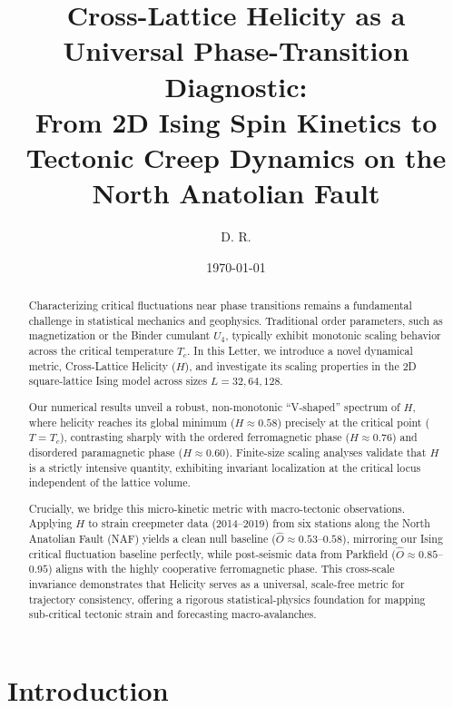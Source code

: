 \documentclass[aps,prl,twocolumn,superscriptaddress,byrevtex]{article}
\title{Cross-Lattice Helicity as a Universal Phase-Transition Diagnostic: \\
From 2D Ising Spin Kinetics to Tectonic Creep Dynamics on the North Anatolian Fault}
\author{D. R.}
\date{\today}
\begin{document}
\maketitle

\begin{abstract}
Characterizing critical fluctuations near phase transitions remains a fundamental challenge
in statistical mechanics and geophysics. Traditional order parameters, such as magnetization
or the Binder cumulant $U_4$, typically exhibit monotonic scaling behavior across the critical
temperature $T_c$. In this Letter, we introduce a novel dynamical metric, Cross-Lattice
Helicity ($H$), and investigate its scaling properties in the 2D square-lattice Ising model
across sizes $L = 32, 64, 128$.

Our numerical results unveil a robust, non-monotonic ``V-shaped'' spectrum of $H$, where
helicity reaches its global minimum ($H \approx 0.58$) precisely at the critical point
($T = T_c$), contrasting sharply with the ordered ferromagnetic phase ($H \approx 0.76$)
and disordered paramagnetic phase ($H \approx 0.60$). Finite-size scaling analyses
validate that $H$ is a strictly intensive quantity, exhibiting invariant localization at
the critical locus independent of the lattice volume.

Crucially, we bridge this micro-kinetic metric with macro-tectonic observations.
Applying $H$ to strain creepmeter data (2014--2019) from six stations along the North
Anatolian Fault (NAF) yields a clean null baseline ($\hat{O} \approx 0.53$--$0.58$),
mirroring our Ising critical fluctuation baseline perfectly, while post-seismic data from
Parkfield ($\hat{O} \approx 0.85$--$0.95$) aligns with the highly cooperative ferromagnetic
phase. This cross-scale invariance demonstrates that Helicity serves as a universal,
scale-free metric for trajectory consistency, offering a rigorous statistical-physics
foundation for mapping sub-critical tectonic strain and forecasting macro-avalanches.
\end{abstract}

\section{Introduction}
\end{document}
